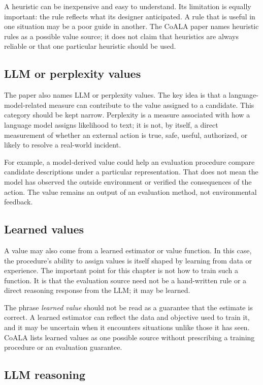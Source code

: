 A heuristic can be inexpensive and easy to understand. Its limitation is equally important: the rule reflects what its designer anticipated. A rule that is useful in one situation may be a poor guide in another. The CoALA paper names heuristic rules as a possible value source; it does not claim that heuristics are always reliable or that one particular heuristic should be used.

\subsection{LLM or perplexity values}

The paper also names LLM or perplexity values. The key idea is that a language-model-related measure can contribute to the value assigned to a candidate. This category should be kept narrow. Perplexity is a measure associated with how a language model assigns likelihood to text; it is not, by itself, a direct measurement of whether an external action is true, safe, useful, authorized, or likely to resolve a real-world incident.

For example, a model-derived value could help an evaluation procedure compare candidate descriptions under a particular representation. That does not mean the model has observed the outside environment or verified the consequences of the action. The value remains an output of an evaluation method, not environmental feedback.

\subsection{Learned values}

A value may also come from a learned estimator or value function. In this case, the procedure's ability to assign values is itself shaped by learning from data or experience. The important point for this chapter is not how to train such a function. It is that the evaluation source need not be a hand-written rule or a direct reasoning response from the LLM; it may be learned.

The phrase \emph{learned value} should not be read as a guarantee that the estimate is correct. A learned estimator can reflect the data and objective used to train it, and it may be uncertain when it encounters situations unlike those it has seen. CoALA lists learned values as one possible source without prescribing a training procedure or an evaluation guarantee.

\subsection{LLM reasoning}

